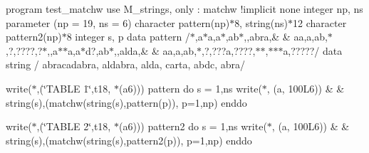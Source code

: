 program test\+\_\+matchw use M\+\_\+strings, only \+: matchw !implicit none integer np, ns parameter (np = 19, ns = 6) character pattern(np)$\ast$8, string(ns)$\ast$12 character pattern2(np)$\ast$8 integer s, p data pattern /\textquotesingle{}$\ast$\textquotesingle{},\textquotesingle{}a$\ast$a\textquotesingle{},\textquotesingle{}a$\ast$\textquotesingle{},\textquotesingle{}ab$\ast$\textquotesingle{},\textquotesingle{},\textquotesingle{}abra\textquotesingle{},\& \& \textquotesingle{}aa\textquotesingle{},\textquotesingle{}a\textquotesingle{},\textquotesingle{}ab\textquotesingle{},\textquotesingle{}$\ast$\textquotesingle{},\textquotesingle{}?\textquotesingle{},\textquotesingle{}????\textquotesingle{},\textquotesingle{}?$\ast$\textquotesingle{},\textquotesingle{},\textquotesingle{}a$\ast$$\ast$a\textquotesingle{},\textquotesingle{}a$\ast$d?\textquotesingle{},\textquotesingle{}ab$\ast$\textquotesingle{},\textquotesingle{},\textquotesingle{}alda\textquotesingle{},\& \& \textquotesingle{}aa\textquotesingle{},\textquotesingle{}a\textquotesingle{},\textquotesingle{}ab\textquotesingle{},\textquotesingle{}$\ast$\textquotesingle{},\textquotesingle{}?\textquotesingle{},\textquotesingle{}???a\textquotesingle{},\textquotesingle{}????\textquotesingle{},\textquotesingle{}$\ast$$\ast$\textquotesingle{},\textquotesingle{}$\ast$$\ast$$\ast$a\textquotesingle{},\textquotesingle{}?????\textquotesingle{}/ data string / \textquotesingle{}abracadabra\textquotesingle{}, \textquotesingle{}aldabra\textquotesingle{}, \textquotesingle{}alda\textquotesingle{}, \textquotesingle{}carta\textquotesingle{}, \textquotesingle{}abdc\textquotesingle{}, \textquotesingle{}abra\textquotesingle{}/

write($\ast$,\textquotesingle{}(\char`\"{}\+T\+A\+B\+L\+E 1\char`\"{},t18, $\ast$(a6))\textquotesingle{}) pattern do s = 1,ns write($\ast$, \textquotesingle{}(a, 100\+L6)\textquotesingle{}) \& \& string(s),(matchw(string(s),pattern(p)), p=1,np) enddo

write($\ast$,\textquotesingle{}(\char`\"{}\+T\+A\+B\+L\+E 2\char`\"{},t18, $\ast$(a6))\textquotesingle{}) pattern2 do s = 1,ns write($\ast$, \textquotesingle{}(a, 100\+L6)\textquotesingle{}) \& \& string(s),(matchw(string(s),pattern2(p)), p=1,np) enddo

